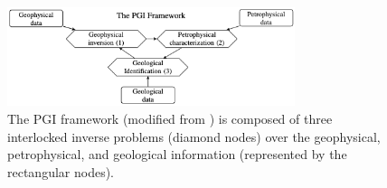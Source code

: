 \begin{figure}
    \begin{center}
    \includegraphics[width=0.75\textwidth]{figures/genererate-pgi-framework-figure.png}
    \end{center}
\caption{
    The PGI framework (modified from \citet{Astic2019}) is composed of three interlocked inverse problems (diamond nodes) over the geophysical, petrophysical, and geological information (represented by the rectangular nodes).
}
\label{fig:pgi-framework}
\end{figure}
